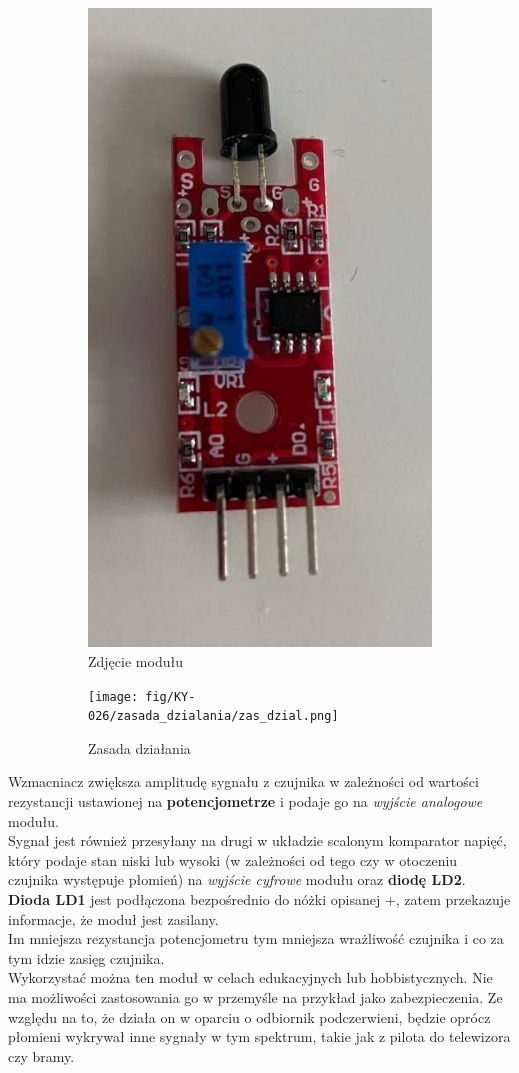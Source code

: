 \documentclass[11pt, a4paper]{article}
\begin{document}
\vspace{0.5cm}
\begin{figure}[h]
\centering
\begin{subfigure}{.4\textwidth}
  \centering
  \includegraphics[width=.4\linewidth]{fig/KY-026/zdj_modułu/zdj2.jpg}
  \caption{Zdjęcie modułu}
  \label{fig:sub1}
\end{subfigure}%
\begin{subfigure}{.4\textwidth}
  \centering
    \texttt{[image: fig/KY-026/zasada\_dzialania/zas\_dzial.png]}
      \caption{Zasada działania}
  \label{zd}
\end{subfigure}
\caption{}
\label{fig:test}
\end{figure}
\vspace{0.5cm}

Wzmacniacz zwiększa amplitudę sygnału z czujnika w zależności od wartości rezystancji ustawionej na \textbf{potencjometrze} i podaje go na \textit{wyjście analogowe} modułu.\\
Sygnał jest również przesyłany na drugi w układzie scalonym komparator napięć, który podaje stan niski lub wysoki (w zależności od tego czy w otoczeniu czujnika występuje płomień) na \textit{wyjście cyfrowe} modułu oraz \textbf{diodę LD2}. \textbf{Dioda LD1} jest podłączona bezpośrednio do nóżki opisanej +, zatem przekazuje informacje, że moduł jest zasilany. \\
Im mniejsza rezystancja potencjometru tym mniejsza wrażliwość czujnika i co za tym idzie zasięg czujnika.  \\
Wykorzystać można ten moduł w celach edukacyjnych lub hobbistycznych. Nie ma możliwości zastosowania go w przemyśle na przykład jako zabezpieczenia. Ze względu na to, że działa on w oparciu o odbiornik podczerwieni, będzie oprócz płomieni wykrywał inne sygnały w tym spektrum, takie jak z pilota do telewizora czy bramy. 
\end{document}
